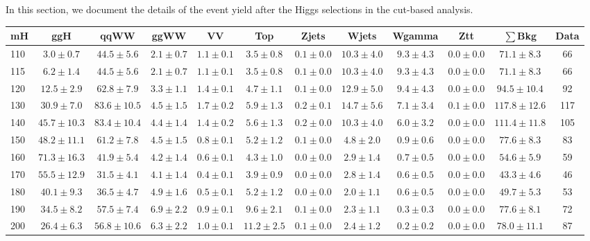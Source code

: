 In this section, we document the details of the event yield after the Higgs 
selections in the cut-based analysis. 

\begin{table}[!ht]
{%
 \tiny
 \begin{center}
 \begin{tabular}{l c c c c c c c c c c c }
 \hline
 mH & ggH & qqWW & ggWW & VV & Top & Zjets & Wjets & Wgamma & Ztt & $\sum$Bkg & Data \\
 \hline
110 & $3.0\pm0.7$ & $44.5\pm5.6$ & $2.1\pm0.7$ & $1.1\pm0.1$ & $3.5\pm0.8$ & $0.1\pm0.0$ & $10.3\pm4.0$ & $9.3\pm4.3$ & $0.0\pm0.0$ & $71.1\pm8.3$ & 66 \\
115 & $6.2\pm1.4$ & $44.5\pm5.6$ & $2.1\pm0.7$ & $1.1\pm0.1$ & $3.5\pm0.8$ & $0.1\pm0.0$ & $10.3\pm4.0$ & $9.3\pm4.3$ & $0.0\pm0.0$ & $71.1\pm8.3$ & 66 \\
120 & $12.5\pm2.9$ & $62.8\pm7.9$ & $3.3\pm1.1$ & $1.4\pm0.1$ & $4.7\pm1.1$ & $0.1\pm0.0$ & $12.9\pm5.0$ & $9.4\pm4.3$ & $0.0\pm0.0$ & $94.5\pm10.4$ & 92 \\
130 & $30.9\pm7.0$ & $83.6\pm10.5$ & $4.5\pm1.5$ & $1.7\pm0.2$ & $5.9\pm1.3$ & $0.2\pm0.1$ & $14.7\pm5.6$ & $7.1\pm3.4$ & $0.1\pm0.0$ & $117.8\pm12.6$ & 117 \\
140 & $45.7\pm10.3$ & $83.4\pm10.4$ & $4.4\pm1.4$ & $1.4\pm0.2$ & $5.6\pm1.3$ & $0.2\pm0.0$ & $10.3\pm4.0$ & $6.0\pm3.2$ & $0.0\pm0.0$ & $111.4\pm11.8$ & 105 \\
150 & $48.2\pm11.1$ & $61.2\pm7.8$ & $4.5\pm1.5$ & $0.8\pm0.1$ & $5.2\pm1.2$ & $0.1\pm0.0$ & $4.8\pm2.0$ & $0.9\pm0.6$ & $0.0\pm0.0$ & $77.6\pm8.3$ & 83 \\
160 & $71.3\pm16.3$ & $41.9\pm5.4$ & $4.2\pm1.4$ & $0.6\pm0.1$ & $4.3\pm1.0$ & $0.0\pm0.0$ & $2.9\pm1.4$ & $0.7\pm0.5$ & $0.0\pm0.0$ & $54.6\pm5.9$ & 59 \\
170 & $55.5\pm12.9$ & $31.5\pm4.1$ & $4.1\pm1.4$ & $0.4\pm0.1$ & $3.9\pm0.9$ & $0.0\pm0.0$ & $2.8\pm1.4$ & $0.6\pm0.5$ & $0.0\pm0.0$ & $43.3\pm4.6$ & 46 \\
180 & $40.1\pm9.3$ & $36.5\pm4.7$ & $4.9\pm1.6$ & $0.5\pm0.1$ & $5.2\pm1.2$ & $0.0\pm0.0$ & $2.0\pm1.1$ & $0.6\pm0.5$ & $0.0\pm0.0$ & $49.7\pm5.3$ & 53 \\
190 & $34.5\pm8.2$ & $57.5\pm7.4$ & $6.9\pm2.2$ & $0.9\pm0.1$ & $9.6\pm2.1$ & $0.1\pm0.0$ & $2.3\pm1.1$ & $0.3\pm0.3$ & $0.0\pm0.0$ & $77.6\pm8.1$ & 72 \\
200 & $26.4\pm6.3$ & $56.8\pm10.6$ & $6.3\pm2.2$ & $1.0\pm0.1$ & $11.2\pm2.5$ & $0.1\pm0.0$ & $2.4\pm1.2$ & $0.2\pm0.2$ & $0.0\pm0.0$ & $78.0\pm11.1$ & 87 \\

\end{tabular}
\end{center}}
\end{table}

